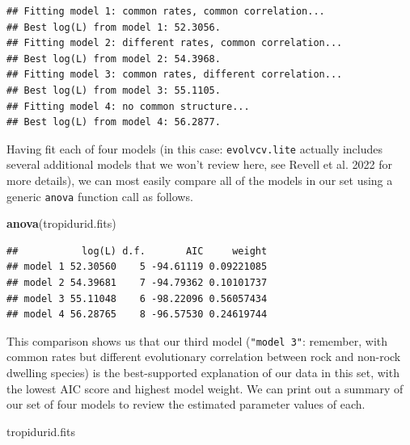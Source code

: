 \documentclass[fleqn,10pt,lineno]{wlpeerj} %
\newenvironment{Shaded}{\begin{snugshade}}{\end{snugshade}}
\newcommand{\FunctionTok}[1]{\textcolor[rgb]{0.13,0.29,0.53}{\textbf{#1}}}
\newcommand{\NormalTok}[1]{#1}
\begin{document}
\begin{verbatim}
## Fitting model 1: common rates, common correlation...
## Best log(L) from model 1: 52.3056.
## Fitting model 2: different rates, common correlation...
## Best log(L) from model 2: 54.3968.
## Fitting model 3: common rates, different correlation...
## Best log(L) from model 3: 55.1105.
## Fitting model 4: no common structure...
## Best log(L) from model 4: 56.2877.
\end{verbatim}

Having fit each of four models (in this case: \texttt{evolvcv.lite} actually includes several additional models that we won't review here, see Revell et al. 2022 for more details), we can most easily compare all of the models in our set using a generic \texttt{anova} function call as follows.

\begin{Shaded}
\begin{Highlighting}[]
\FunctionTok{anova}\NormalTok{(tropidurid.fits)}
\end{Highlighting}
\end{Shaded}

\begin{verbatim}
##           log(L) d.f.       AIC     weight
## model 1 52.30560    5 -94.61119 0.09221085
## model 2 54.39681    7 -94.79362 0.10101737
## model 3 55.11048    6 -98.22096 0.56057434
## model 4 56.28765    8 -96.57530 0.24619744
\end{verbatim}

This comparison shows us that our third model (\texttt{"model\ 3"}: remember, with common rates but different evolutionary correlation between rock and non-rock dwelling species) is the best-supported explanation of our data in this set, with the lowest AIC score and highest model weight. We can print out a summary of our set of four models to review the estimated parameter values of each.

\begin{Shaded}
\begin{Highlighting}[]
\NormalTok{tropidurid.fits}
\end{Highlighting}
\end{Shaded}
\end{document}
